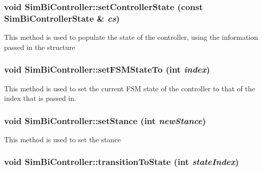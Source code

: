 \hypertarget{classCartWheel_1_1Core_1_1SimBiController_afcc2d6d9f5478bba116554d81fe561b9}{
\subsubsection[{setControllerState}]{\setlength{\rightskip}{0pt plus 5cm}void SimBiController::setControllerState (const {\bf SimBiControllerState} \& {\em cs})}}
\label{classCartWheel_1_1Core_1_1SimBiController_afcc2d6d9f5478bba116554d81fe561b9}
This method is used to populate the state of the controller, using the information passed in the structure \hypertarget{classCartWheel_1_1Core_1_1SimBiController_ae19bf9de3be68e38c4d5a834075031f4}{
\subsubsection[{setFSMStateTo}]{\setlength{\rightskip}{0pt plus 5cm}void SimBiController::setFSMStateTo (int {\em index})}}
\label{classCartWheel_1_1Core_1_1SimBiController_ae19bf9de3be68e38c4d5a834075031f4}
This method is used to set the current FSM state of the controller to that of the index that is passed in. \hypertarget{classCartWheel_1_1Core_1_1SimBiController_afd4cd02d1e72d596c4ce8a335d61b935}{
\subsubsection[{setStance}]{\setlength{\rightskip}{0pt plus 5cm}void SimBiController::setStance (int {\em newStance})}}
\label{classCartWheel_1_1Core_1_1SimBiController_afd4cd02d1e72d596c4ce8a335d61b935}
This method is used to set the stance \hypertarget{classCartWheel_1_1Core_1_1SimBiController_a3bde303de6008f855cc8479eb0519cb9}{
\subsubsection[{transitionToState}]{\setlength{\rightskip}{0pt plus 5cm}void SimBiController::transitionToState (int {\em stateIndex})}}
